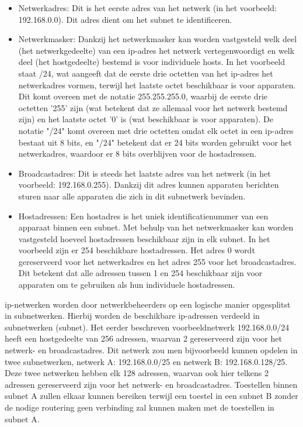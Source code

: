 \begin{itemize}
    \item Netwerkadres: Dit is het eerste adres van het netwerk (in het voorbeeld: 192.168.0.0). Dit adres dient om het subnet te identificeren.
    \item Netwerkmasker: Dankzij het netwerkmasker kan worden vastgesteld welk deel (het netwerkgedeelte) van een \acrshort{ip}-adres het netwerk vertegenwoordigt en welk deel (het hostgedeelte) bestemd is voor individuele hosts. In het voorbeeld staat /24, wat aangeeft dat de eerste drie octetten van het \acrshort{ip}-adres het netwerkadres vormen, terwijl het laatste octet beschikbaar is voor apparaten. Dit komt overeen met de notatie 255.255.255.0, waarbij de eerste drie octetten '255' zijn (wat betekent dat ze allemaal voor het netwerk bestemd zijn) en het laatste octet '0' is (wat beschikbaar is voor apparaten). De notatie "/24" komt overeen met drie octetten omdat elk octet in een \acrshort{ip}-adres bestaat uit 8 bits, en "/24" betekent dat er 24 bits worden gebruikt voor het netwerkadres, waardoor er 8 bits overblijven voor de hostadressen.      
    \item Broadcastadres: Dit is steeds het laatste adres van het netwerk (in het voorbeeld: 192.168.0.255). Dankzij dit adres kunnen apparaten berichten sturen naar alle apparaten die zich in dit subnetwerk bevinden.
    \item Hostadressen: Een hostadres is het uniek identificatienummer van een apparaat binnen een subnet. Met behulp van het netwerkmasker kan worden vastgesteld hoeveel hostadressen beschikbaar zijn in elk subnet. In het voorbeeld zijn er 254 beschikbare hostadressen. Het adres 0 wordt gereserveerd voor het netwerkadres en het adres 255 voor het broadcastadres. Dit betekent dat alle adressen tussen 1 en 254 beschikbaar zijn voor apparaten om te gebruiken als hun individuele hostadressen.
\end{itemize}


\acrshort{ip}-netwerken worden door netwerkbeheerders op een logische manier opgesplitst in subnetwerken. Hierbij worden de beschikbare \acrshort{ip}-adressen verdeeld in subnetwerken (subnet). Het eerder beschreven voorbeeldnetwerk 192.168.0.0/24 heeft een hostgedeelte van 256 adressen, waarvan 2 gereserveerd zijn voor het netwerk- en broadcastadres. Dit netwerk zou men bijvoorbeeld kunnen opdelen in twee subnetwerken, netwerk A: 192.168.0.0/25 en netwerk B: 192.168.0.128/25. Deze twee netwerken hebben elk 128 adressen, waarvan ook hier telkens 2 adressen gereserveerd zijn voor het netwerk- en broadcastadres.
Toestellen binnen subnet A zullen elkaar kunnen bereiken terwijl een toestel in een subnet B zonder de nodige routering geen verbinding zal kunnen maken met de toestellen in subnet A.

